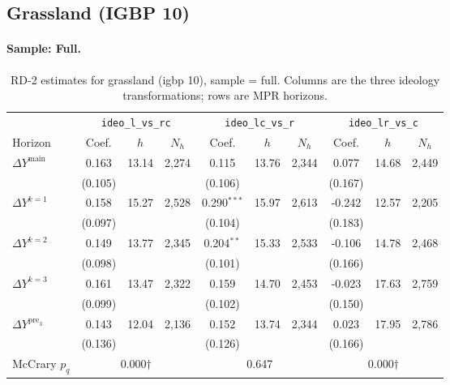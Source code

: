 \documentclass[11pt]{article}
\begin{document}
\clearpage
\subsection{Grassland (IGBP 10)}
\paragraph{Sample: Full.}
\begin{table}[H]
\centering
\scriptsize
\caption{RD-2 estimates for grassland (igbp 10), sample = full.
Columns are the three ideology transformations; rows are MPR horizons.}
\label{tab:rd2_grassland_all}
\begin{tabular}{l ccc ccc ccc}
\toprule
 & \multicolumn{3}{c}{\texttt{ideo\_l\_vs\_rc}}
 & \multicolumn{3}{c}{\texttt{ideo\_lc\_vs\_r}}
 & \multicolumn{3}{c}{\texttt{ideo\_lr\_vs\_c}} \\
\cmidrule(lr){2-4} \cmidrule(lr){5-7} \cmidrule(lr){8-10}
Horizon & Coef. & $h$ & $N_h$ & Coef. & $h$ & $N_h$ & Coef. & $h$ & $N_h$ \\
\midrule
$\Delta Y^{\text{main}}$ & 0.163 & 13.14 & 2,274 & 0.115 & 13.76 & 2,344 & 0.077 & 14.68 & 2,449 \\
 & (0.105) &  &  & (0.106) &  &  & (0.167) &  &  \\
\addlinespace[1pt]
$\Delta Y^{k=1}$ & 0.158 & 15.27 & 2,528 & 0.290$^{***}$ & 15.97 & 2,613 & -0.242 & 12.57 & 2,205 \\
 & (0.097) &  &  & (0.104) &  &  & (0.183) &  &  \\
\addlinespace[1pt]
$\Delta Y^{k=2}$ & 0.149 & 13.77 & 2,345 & 0.204$^{**}$ & 15.33 & 2,533 & -0.106 & 14.78 & 2,468 \\
 & (0.098) &  &  & (0.101) &  &  & (0.166) &  &  \\
\addlinespace[1pt]
$\Delta Y^{k=3}$ & 0.161 & 13.47 & 2,322 & 0.159 & 14.70 & 2,453 & -0.023 & 17.63 & 2,759 \\
 & (0.099) &  &  & (0.102) &  &  & (0.150) &  &  \\
\addlinespace[1pt]
$\Delta Y^{\text{pre}_3}$ & 0.143 & 12.04 & 2,136 & 0.152 & 13.74 & 2,344 & 0.023 & 17.95 & 2,786 \\
 & (0.136) &  &  & (0.126) &  &  & (0.166) &  &  \\
\addlinespace[1pt]
\midrule
McCrary $p_q$ & \multicolumn{3}{c}{0.000$\dagger$} & \multicolumn{3}{c}{0.647} & \multicolumn{3}{c}{0.000$\dagger$} \\
\bottomrule
\end{tabular}
\end{table}
\end{document}
